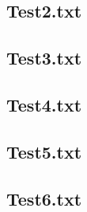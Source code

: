 \documentclass[a4paper,10pt,titlepage]{report}
\begin{document}
\newpage
\subsection{Test2.txt}


\newpage
\subsection{Test3.txt}


\newpage
\subsection{Test4.txt}


\newpage
\subsection{Test5.txt}


\newpage
\subsection{Test6.txt}

\end{document}
